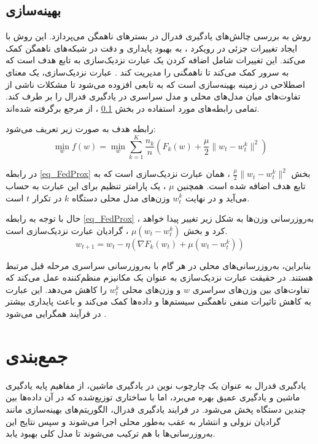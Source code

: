 \subsection{
بهینه‌سازی
}\label{sec_FedProx}
روش
به بررسی چالش‌های یادگیری فدرال در بسترهای ناهمگن می‌پردازد. این روش با ایجاد تغییرات جزئی در رویکرد
%
، به بهبود پایداری و دقت در شبکه‌های ناهمگن کمک می‌کند. این تغییرات شامل اضافه کردن یک عبارت نزدیک‌سازی%
به تابع هدف است که به سرور کمک می‌کند تا ناهمگنی را مدیریت کند
\cite{li2020federatedheteroneneous}.
عبارت نزدیک‌سازی، یک معنای اصطلاحی در زمینه بهینه‌سازی است که به تابعی افزوده می‌شود تا مشکلات ناشی از تفاوت‌های میان مدل‌های محلی و مدل سراسری در یادگیری فدرال را بر طرف کند.
تمامی رابطه‌های مورد استفاده در بخش
\ref{sec_FedProx}%
، از مرجع 
\cite{li2020federatedheteroneneous} 
برگرفته شده‌اند.

رابطه هدف
به صورت زیر تعریف می‌شود:
\begin{equation}
\min_{w} f(w) = \min_{w} \sum_{k=1}^{K} \frac{n_k}{n} \left( F_k(w) + \frac{\mu}{2} \|w_t - w_t^k\|^2 \right)
\label{eq_FedProx}
\end{equation}

در رابطه
\eqref{eq_FedProx}
بخش
$\frac{\mu}{2} \|w_t - w_t^k\|^2$%
، همان عبارت نزدیک‌سازی است که به تابع هدف اضافه شده است. همچنین
$\mu$%
، یک پارامتر تنظیم برای این عبارت به حساب می‌آید و در نهایت
$w_t^k$
وزن‌های مدل محلی دستگاه
$k$
در تکرار
$t$
است.

حال با توجه به رابطه
\eqref{eq_FedProx}%
، به‌روزرسانی وزن‌ها به شکل زیر تغییر پیدا خواهد کرد و بخش
$\mu (w_t - w_t^k)$%
، گرادیان عبارت نزدیک‌‌سازی است.
\begin{equation}
w_{t+1} = w_t - \eta (\nabla F_k(w_t) + \mu (w_t - w_t^k))
\end{equation}

بنابراین، به‌روزرسانی‌های محلی در هر گام با به‌روزرسانی سراسری مرحله قبل مرتبط هستند. در حقیقت عبارت نزدیک‌سازی به عنوان یک مکانیزم منظم‌کننده%
عمل می‌کند که تفاوت‌های بین وزن‌های سراسری
$w$
و وزن‌های محلی
$w_t^k$
را کاهش می‌دهد. این عبارت به کاهش تاثیرات منفی ناهمگنی سیستم‌ها و داده‌ها کمک می‌کند و باعث پایداری بیشتر در فرآیند همگرایی می‌شود
\cite{li2020federatedheteroneneous}.


\section{جمع‌بندی}
یادگیری فدرال به عنوان یک چارچوب نوین در یادگیری ماشین، از مفاهیم پایه یادگیری ماشین و یادگیری عمیق بهره می‌برد، اما با ساختاری توزیع‌شده که در آن داده‌ها بین چندین دستگاه پخش می‌شود. در فرایند یادگیری فدرال، الگوریتم‌های بهینه‌سازی مانند گرادیان نزولی و انتشار به عقب به‌طور محلی اجرا می‌شوند و سپس نتایج این به‌روزرسانی‌ها با هم ترکیب می‌شوند تا مدل کلی بهبود یابد.

